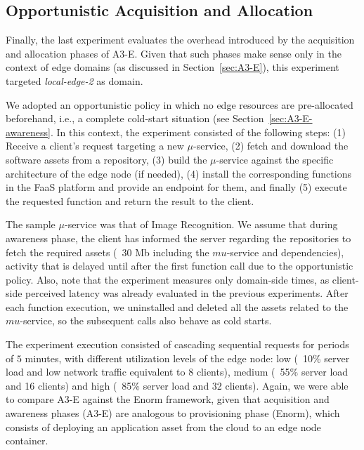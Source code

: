 


\subsection{Opportunistic Acquisition and Allocation}

Finally, the last experiment evaluates the overhead introduced by the acquisition and allocation phases of A3-E. Given that such phases make sense only in the context of edge domains (as discussed in Section~\ref{sec:A3-E}), this experiment targeted \textit{local-edge-2} as domain. 

We adopted an opportunistic policy in which no edge resources are pre-allocated beforehand, i.e., a complete cold-start situation (see Section~\ref{sec:A3-E-awareness}. In this context, the experiment consisted of the following steps:
(1) Receive a client's request targeting a new $\mu$-service, (2) fetch and download the software assets from a repository, (3) build the $\mu$-service against the specific architecture of the edge node (if needed), (4) install the corresponding functions in the FaaS platform and provide an endpoint for them, and finally (5) execute the requested function and return the result to the client.

The sample $\mu$-service was that of Image Recognition. We assume that during awareness phase, the client has informed the server regarding the repositories to fetch the required assets (~30 Mb including the $mu$-service and dependencies), activity that is delayed until after the first function call due to the opportunistic policy. Also, note that the experiment measures only domain-side times, as client-side perceived latency was already evaluated in the previous experiments. After each function execution, we uninstalled and deleted all the assets related to the $mu$-service, so the subsequent calls also behave as cold starts.

The experiment execution consisted of cascading sequential requests for periods of $5$ minutes, with different utilization levels of the edge node: low (~10\% server load and low network traffic equivalent to 8 clients), medium (~55\% server load and 16 clients) and high (~85\% server load and 32 clients). Again, we were able to compare A3-E against the Enorm framework, given that acquisition and awareness phases (A3-E) are analogous to provisioning phase (Enorm), which consists of deploying an application asset from the cloud to an edge node container. 

